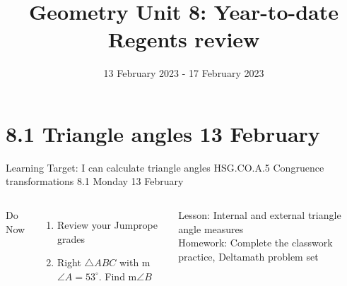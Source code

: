 

\newcommand\ticks{}
  \def\ticks{{Bar[scale=2]}-{Bar[scale=2]}}
\newcommand\paraticks{}
  \def\paraticks{{Straight Barb[reversed, scale=2]}-{Straight Barb[scale=2]}}

\title{Geometry Unit 8: Year-to-date Regents review}
\date{13 February 2023 - 17 February 2023}


\frame{\titlepage}
\section[Outline]{}
\frame{\tableofcontents}

\section{8.1 Triangle angles \hfill 13 February \,}
\begin{frame}{Learning Target: I can calculate triangle angles}
  {HSG.CO.A.5 Congruence transformations \hfill \alert{8.1 Monday 13 February}}
  \begin{columns}
    Do Now
    \begin{enumerate}
      \item Review your Jumprope grades
      \item Right $\triangle ABC$ with m$\angle A = 53^\circ$. Find  m$\angle B$
    \end{enumerate}
    Lesson: Internal and external triangle angle measures \\
    Homework: Complete the classwork practice, Deltamath problem set
    \begin{flushright}
    \end{flushright}
  \end{columns}
\end{frame}

